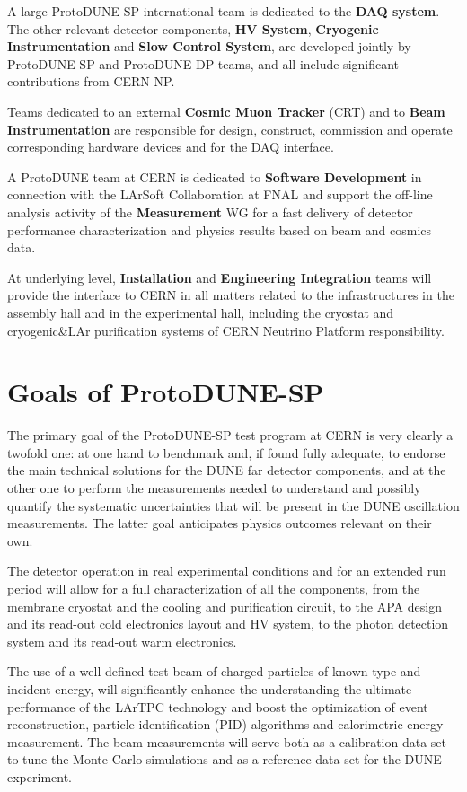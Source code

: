 \documentclass[11pt, oneside]{article}   	%
\begin{document}
A large ProtoDUNE-SP international team is dedicated to the {\bf DAQ system}. 
The other relevant detector components,  {\bf HV System},  {\bf Cryogenic Instrumentation} and {\bf Slow Control System}, are developed jointly by ProtoDUNE SP and ProtoDUNE DP teams, and all include significant contributions from CERN NP.

Teams dedicated to an external {\bf Cosmic Muon Tracker} (CRT) and to {\bf Beam Instrumentation} are responsible for design, construct, commission and operate corresponding hardware devices and for the DAQ interface.

A ProtoDUNE team at CERN is dedicated to {\bf Software Development} in connection with the LArSoft Collaboration at FNAL and support the off-line analysis activity of the {\bf Measurement} WG for a fast delivery of detector performance characterization and physics results based on beam and cosmics data.

At underlying level, {\bf Installation} and {\bf Engineering Integration} teams will provide the interface to CERN in all matters related to the infrastructures in the assembly hall and in the experimental hall, including the cryostat and cryogenic\&LAr purification systems of CERN Neutrino Platform responsibility.

\section{Goals of ProtoDUNE-SP}
The primary goal of the ProtoDUNE-SP test program at CERN is very clearly a twofold one: at one hand to benchmark and, if found fully adequate, to endorse the main technical solutions for the DUNE far detector components, and at the other one to perform the measurements needed to understand and possibly quantify the systematic uncertainties that will be present in the DUNE oscillation measurements. The latter goal anticipates physics outcomes relevant on their own.

The detector operation in real experimental conditions and for an extended run period will allow for a full characterization of all 
the components, from the membrane cryostat and the cooling and purification circuit, to the APA design and its read-out cold electronics layout and HV system, to the photon detection system and its read-out warm electronics.

The use of a well defined test beam of charged particles of known type and incident  energy, will significantly enhance the understanding the ultimate performance of the LArTPC technology and boost the optimization of event reconstruction, particle identification (PID) algorithms and calorimetric energy measurement.  The beam measurements will serve both as a calibration data set to tune the Monte Carlo simulations and as a reference data set for the DUNE experiment. 
\end{document}
